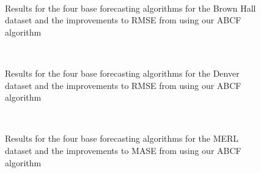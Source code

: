 \begin{figure}[!h]
	\begin{center}
		 \\
	\end{center}
	\caption{Results for the four base forecasting algorithms for the Brown Hall dataset and the improvements to RMSE from using our ABCF algorithm}
	\label{fig:rmse_brown_results}
\end{figure}

\begin{figure}[!h]
	\begin{center}
		 \\
	\end{center}
	\caption{Results for the four base forecasting algorithms for the Denver dataset and the improvements to RMSE from using our ABCF algorithm}
	\label{fig:rmse_denver_results}
\end{figure}

\newpage

\begin{figure}[!h]
	\begin{center}
		 \\
	\end{center}
	\caption{Results for the four base forecasting algorithms for the MERL dataset and the improvements to MASE from using our ABCF algorithm}
	\label{fig:mase_merl_results}
\end{figure}

